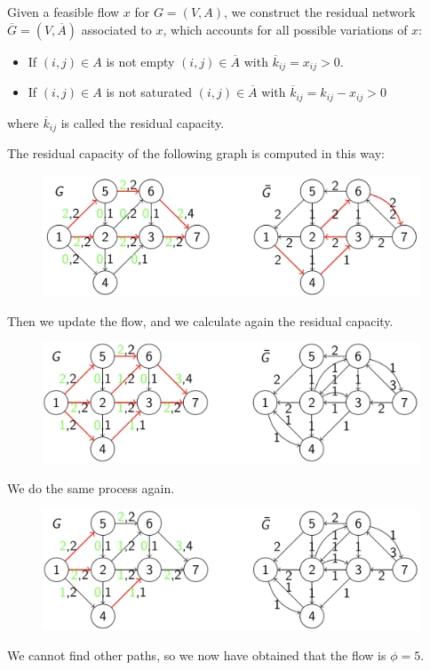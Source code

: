 \documentclass[12pt, a4paper]{report}
\newtheorem[style=M,bodystyle=\normalfont]{proposition}{Proposition}
\newtheorem[style=M,bodystyle=\normalfont]{theorem}{Theorem}
\newtheorem[style=M,bodystyle=\normalfont]{corollary}{Corollary}
\newtheorem[style=M,bodystyle=\normalfont]{lemma}{Lemma}
\newtheorem[style=M,bodystyle=\normalfont]{definition}{Definition}
\begin{document}
    Given a feasible flow $x$ for $G=(V,A)$, we construct the residual network $\overline{G}=(V,\overline{A})$ associated to $x$, which 
    accounts for all possible variations of $x$: 
    \begin{itemize}
        \item If $(i,j) \in A$ is not empty $(i,j) \in \overline{A}$ with $\overline{k}_{ij}=x_{ij}>0$.
        \item If $(i,j) \in A$ is not saturated $(i,j) \in \overline{A}$ with $\overline{k}_{ij}=k_{ij}-x_{ij}>0$
    \end{itemize}
    where $\overline{k}_{ij}$ is called the residual capacity. 
    \begin{example}
        The residual capacity of the following graph is computed in this way: 
        \begin{figure}[H]
            \centering
            \includegraphics[width=0.75\linewidth]{images/residual1.png}
        \end{figure}
        Then we update the flow, and we calculate again the residual capacity. 
        \begin{figure}[H]
            \centering
            \includegraphics[width=0.75\linewidth]{images/residual2.png}
        \end{figure}
        We do the same process again.
        \begin{figure}[H]
            \centering
            \includegraphics[width=0.75\linewidth]{images/residual3.png}
        \end{figure}
        We cannot find other paths, so we now have obtained that the flow is $\phi=5$.
    \end{example}
\end{document}
